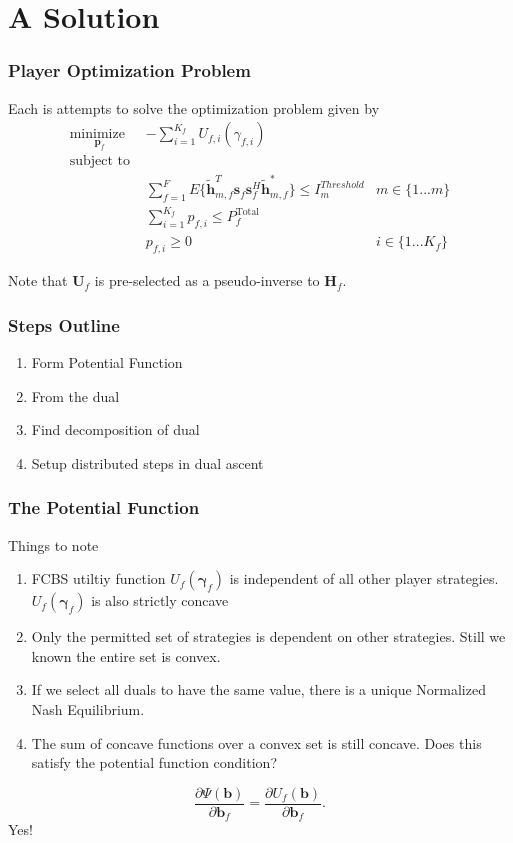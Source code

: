 \documentclass[10pt,tgadventor, onlymath]{beamer}
\begin{document}
\section{A Solution}
\begin{frame}
\frametitle{Player Optimization Problem}
Each is attempts to solve the optimization problem given by 
	\begin{subequations}
	\begin{align}
	    \underset{\mathbf{p}_{f} }{\text{minimize  }} \;
	    & - \sum_{i=1}^{K_f}
    	U_{f,i}(\gamma_{f,i}) \label{player_opt_c} \\
	    \text{subject to  }\\
	  &
	  \sum^F_{f=1} E\{ \mathbf{\tilde{h}}_{m,f}^T  \mathbf{s}_{f} 						
	\mathbf{s}_{f}^{H} \mathbf{\tilde{h}}_{m,f}^* \}
	\leq I^{Threshold}		
	_{m} & m \in \{1 ...m\} 
		\label{interference_const_c}\\
        & 
        	\sum_{i=1}^{K_{f}} p_{f,i}
	   \leq P_{f}^{\text{Total}}  \label{power_const_c}\\
        & p_{f,i} \geq 0 &  i\in \{1 ...K_{f}\} \label{pos_power_const_c}
	\end{align}
	\end{subequations}

Note that $\mathbf{U}_{f}$ is pre-selected as a pseudo-inverse to  $\mathbf{H}_f$.
\end{frame}


\begin{frame}
\frametitle{Steps Outline}
\begin{enumerate}
\item
	Form Potential Function
\item 
	From the dual
\item 
	Find decomposition of dual
\item
	Setup distributed steps in dual ascent
\end{enumerate}
\end{frame}

\begin{frame}
\frametitle{The Potential Function}
Things to note
\begin{enumerate}
\item
	FCBS utiltiy function $U_{f}(\boldsymbol{\gamma}_{f})$ is independent of all other player strategies. 
	$U_{f}(\boldsymbol{\gamma}_{f})$ is also strictly concave
\item 
	Only the permitted set of strategies is dependent on other strategies. Still we known the entire set is convex.
\item 
	If we select all duals to have the same value, there is a unique Normalized Nash Equilibrium.
\item
	The sum of concave functions over a convex set is still concave. Does this satisfy the potential function condition?
\end{enumerate}
\begin{equation}\label{potential_game_condition}
\frac{\partial \Psi(\mathbf{b})}{\partial \mathbf{b}_{f}}
 =
 \frac{\partial U_f(\mathbf{b})}{\partial \mathbf{b}_{f}}.
\end{equation} 
Yes!
\end{frame}
\end{document}
